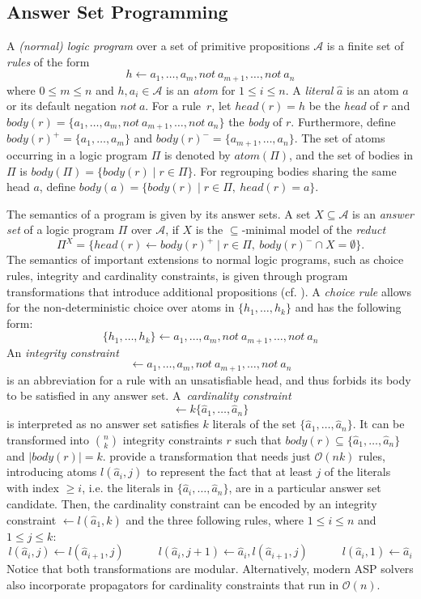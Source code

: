 \documentclass{tlp}
\newcommand{\alphabet}{\mathcal{A}}
\newcommand{\atom}[1]{atom(#1)}
\newcommand{\head}[1]{head(#1)}
\newcommand{\body}[1]{body(#1)}
\newcommand{\dneg}{not\ }
\begin{document}
\subsection{Answer Set Programming}

A \emph{(normal) logic program} over a set of primitive propositions $\alphabet$ is a finite set of \emph{rules} of the form
\[
h \leftarrow a_1 , \dots , a_m, \dneg a_{m+1} , \dots , \dneg a_n
\]
where $0 \leq m \leq n$ and $h, a_i \in \alphabet$ is an \emph{atom} for $1 \leq i \leq n$.
A \emph{literal} $\hat{a}$ is an atom $a$ or its default negation $\dneg a$.
For a rule~$r$, let $\head{r} = h$ be the \emph{head} of $r$ and $\body{r} = \{a_1 , \dots , a_m, \dneg a_{m+1} , \dots , \dneg a_n\}$ the \emph{body} of $r$. Furthermore, define $\body{r}^{+} = \{a_1 , \dots , a_m\}$ and $\body{r}^{-} = \{a_{m+1} , \dots , a_n\}$. The set of atoms occurring in a logic program $\Pi$ is denoted by $\atom{\Pi}$, and the set of bodies in $\Pi$ is $\body{\Pi} = \{ \body{r} \mid r \in \Pi \}$. For regrouping bodies sharing the same head $a$, define $\body{a} = \{ \body{r} \mid r \in \Pi,\ \head{r} = a \}$.

The semantics of a program is given by its answer sets. A set $X \subseteq \alphabet$ is an \emph{answer set} of a logic program $\Pi$ over $\alphabet$, if $X$ is the $\subseteq$-minimal model of the \emph{reduct} \cite{gellif88b}
\[
\Pi^{X} = \{ \head{r} \leftarrow \body{r}^{+} \mid r \in \Pi,\ \body{r}^{-} \cap X = \emptyset\}.
\]
The semantics of important extensions to normal logic programs, such as choice rules, integrity and cardinality constraints, is given through program transformations that introduce additional propositions (cf. ).
A \emph{choice rule} allows for the non-deterministic choice over atoms in $\{h_1, \dots, h_k\}$ and has the following form:
\[
\{h_1, \dots, h_k\} \leftarrow a_1 , \dots , a_m, \dneg a_{m+1} , \dots , \dneg a_n
\]
An \emph{integrity constraint}
\[
\leftarrow a_1 , \dots , a_m, \dneg a_{m+1} , \dots , \dneg a_n
\]
is an abbreviation for a rule with an unsatisfiable head, and thus forbids its body to be satisfied in any answer set.
A~\emph{cardinality constraint}
\[
\leftarrow k \{\hat{a}_1 , \dots, \hat{a}_n\}
\]
is interpreted as no answer set satisfies $k$ literals of the set $\{\hat{a}_1 , \dots, \hat{a}_n\}$. It can be transformed into ${n \choose k}$ integrity constraints $r$ such that $\body{r} \subseteq \{\hat{a}_1 , \dots, \hat{a}_n\}$ and $|\body{r}| = k$.
 provide a transformation that needs just $\mathcal{O}(nk)$ rules, introducing atoms $l(\hat{a}_i,j)$ to represent the fact that at least $j$ of the literals with index $\geq i$, i.e. the literals in $\{ \hat{a}_i, \dots, \hat{a}_n \}$,
 are in a particular answer set candidate. Then, the cardinality constraint can be encoded by an integrity constraint $\leftarrow l(\hat{a}_1,k)$ and the three following rules, where $1 \leq i \leq n$ and $1 \leq j \leq k$:
\[
l(\hat{a}_i,j) \leftarrow l(\hat{a}_{i+1},j) \qquad\quad
l(\hat{a}_i,j+1) \leftarrow \hat{a}_i, l(\hat{a}_{i+1},j)\qquad\quad
l(\hat{a}_i,1) \leftarrow \hat{a}_i
\]
Notice that both transformations are modular. Alternatively, modern ASP solvers also incorporate propagators for cardinality constraints that run in $\mathcal{O}(n)$.
\end{document}
